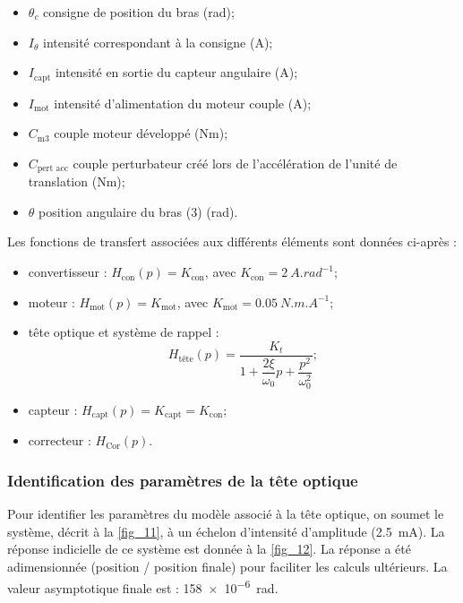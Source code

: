 \begin{multicols}{2}
\begin{itemize}
\item $\theta_c$ consigne de position du bras (rad);
\item $I_{\theta}$ intensité correspondant à la consigne (A);
\item $I_{\text{capt}}$ intensité en sortie du capteur angulaire (A);
\item $I_{\text{mot}}$ intensité d’alimentation du moteur couple (A);
\item $C_{\text{m3}}$ couple moteur développé (Nm);
\item $C_{\text{pert acc}}$ couple perturbateur créé lors de l’accélération de
l’unité de translation (Nm);
\item $\theta$ position angulaire du bras (3) (rad).
\end{itemize}
\end{multicols}

Les fonctions de transfert associées aux différents éléments sont données ci-après :
\begin{multicols}{2}
\begin{itemize}
\item convertisseur : $H_{\text{con}}(p)=K_{\text{con}}$, avec $K_{\text{con}}=\SI{2}{A.rad^{-1}}$;
\item moteur : $H_{\text{mot}}(p)=K_{\text{mot}}$, avec $K_{\text{mot}}=\SI{0,05}{N.m.A^{-1}}$;
\item tête optique et système de rappel : $$H_{\text{tête}}(p)=\dfrac{K_t}{1+\dfrac{2\xi}{\omega_0}p+\dfrac{p^2}{\omega_0^2}};$$
\item capteur : $H_{\text{capt}}(p)=K_{\text{capt}}=K_{\text{con}}$;
\item correcteur : $H_{\text{Cor}}(p)$.
\end{itemize}
\end{multicols}
\fi

\subsubsection{Identification des paramètres de la tête optique}

\ifprof
\else

Pour identifier les paramètres du modèle associé à la tête optique, on soumet le système, décrit à la \autoref{fig_11}, à un échelon d’intensité d’amplitude (\SI{2,5}{mA}). La
réponse indicielle de ce système est donnée à la \autoref{fig_12}. La réponse a été adimensionnée (position / position
finale) pour faciliter les calculs ultérieurs. La valeur asymptotique finale est : \SI{158e-6}{rad}.


